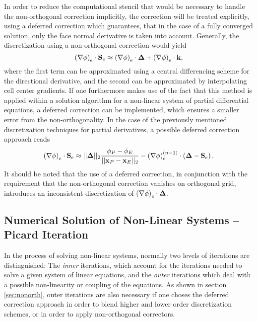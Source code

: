 In order to reduce the computational stencil that would be necessary to handle the non-orthogonal correction implicitly, the correction will be treated explicitly, using a deferred correction which guarantees, that in the case of a fully converged solution, only the face normal derivative is taken into account. Generally, the discretization using a non-orthogonal correction would yield 
\begin{displaymath}
  \left( \nabla \phi \right)_e \cdot \mathbf{S}_e \approx \left(\nabla \phi \right)_e \cdot \boldsymbol{\Delta} + \left( \nabla \phi \right)_e \cdot \mathbf{k},
\end{displaymath}
where the first term can be approximated using a central differencing scheme for the directional derivative, and the second can be approximated by interpolating cell center gradients. If one furthermore makes use of the fact that this method is applied within a solution algorithm for a non-linear system of partial differential equations, a deferred correction can be implemented, which ensures a smaller error from the non-orthogonality. In the case of the previously mentioned discretization techniques for partial derivatives, a possible deferred correction approach reads
\begin{displaymath}
  \left( \nabla \phi \right)_e \cdot \mathbf{S}_e \approx ||\boldsymbol{\Delta}||_2 \frac{\phi_P - \phi_E}{||\mathbf{x}_P - \mathbf{x}_E||_2} - \left(\nabla \phi \right)_e^{(n-1)} \cdot \left(\boldsymbol{\Delta} - \mathbf{S}_e \right).
\end{displaymath}
It should be noted that the use of a deferred correction, in conjunction with the requirement that the non-orthogonal correction vanishes on orthogonal grid, introduces an inconsistent discretization of \( \left(\nabla \phi \right)_e \cdot \boldsymbol{\Delta} \).

\subsection{Numerical Solution of Non-Linear Systems -- Picard Iteration}
\label{sec:nonlinear}

In the process of solving non-linear systems, normally two levels of iterations are distinguished: The \emph{inner} iterations, which account for the iterations needed to solve a given system of linear equations, and the \emph{outer} iterations which deal with a possible non-linearity or coupling of the equations. As shown in section \ref{sec:nonorth}, outer iterations are also necessary if one choses the deferred correction approach in order to blend higher and lower order discretization schemes, or in order to apply non-orthogonal correctors.

